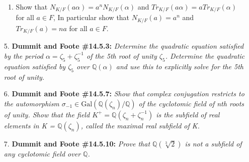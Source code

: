 \documentclass[12pt]{article}
\newcommand{\Q}{\mathbb{Q}}
\newcommand{\Gal}{\text{Gal}}
\begin{document}
\begin{enumerate}
\begin{enumerate}
    \item Show that $N_{K/F}(a\alpha) = a^n N_{K/F}(\alpha)$ and $Tr_{K/F}(a\alpha) = aTr_{K/F}(\alpha)$ for all $a\in F$, In particular show that $N_{K/F}(a) = a^n$ and $Tr_{K/F}(a) = na$ for all $a\in F$.
\end{enumerate}

\item[5.] \textbf{Dummit and Foote \#14.5.3:} \textit{Determine the quadratic equation satisfied by the period $\alpha = \zeta_5 + \zeta_5^{-1}$ of the 5th root of unity $\zeta_5$. Determine the quadratic equation satisfied by $\zeta_5$ over $\Q(\alpha)$ and use this to explicitly solve for the 5th root of unity.}

\item[6.] \textbf{Dummit and Foote \#14.5.7:} \textit{Show that complex conjugation restricts to the automorphism $\sigma_{-1}\in \Gal(\Q(\zeta_n)/\Q)$ of the cyclotomic field of nth roots of unity. Show that the field $K^+ = \Q(\zeta_n + \zeta_n^{-1})$ is the
subfield of real elements in K = $\Q(\zeta_n)$, called the maximal real subfield of K.}

\item[7.] \textbf{Dummit and Foote \#14.5.10:} \textit{Prove that $\Q(\sqrt[3]{2})$ is not a subfield of any cyclotomic field over $\Q$.}

\end{enumerate}
\end{document}
